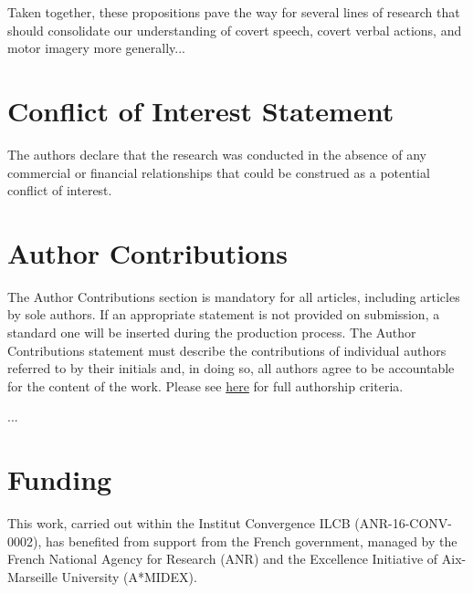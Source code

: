 \documentclass[utf8]{template/frontiersSCNS} %
\begin{document}
Taken together, these propositions pave the way for several lines of research that should consolidate our understanding of covert speech, covert verbal actions, and motor imagery more generally...

\section*{Conflict of Interest Statement}


The authors declare that the research was conducted in the absence of any commercial or financial relationships that could be construed as a potential conflict of interest.

\section*{Author Contributions}

\color{blue}

The Author Contributions section is mandatory for all articles, including articles by sole authors. If an appropriate statement is not provided on submission, a standard one will be inserted during the production process. The Author Contributions statement must describe the contributions of individual authors referred to by their initials and, in doing so, all authors agree to be accountable for the content of the work. Please see  \href{http://home.frontiersin.org/about/author-guidelines#AuthorandContributors}{here} for full authorship criteria.

\color{black}

...

\section*{Funding}


This work, carried out within the Institut Convergence ILCB (ANR-16-CONV-0002), has benefited from support from the French government, managed by the French National Agency for Research (ANR) and the Excellence Initiative of Aix-Marseille University (A*MIDEX).
\end{document}
